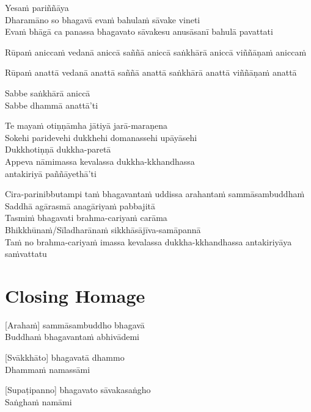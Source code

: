 Yesaṁ pariññāya\\
Dharamāno so bhagavā evaṁ bahulaṁ sāvake vineti\\
Evaṁ bhāgā ca panassa bhagavato sāvakesu anusāsanī bahulā pavattati

Rūpaṁ aniccaṁ vedanā aniccā saññā aniccā saṅkhārā aniccā viññāṇaṁ aniccaṁ

Rūpaṁ anattā vedanā anattā saññā anattā saṅkhārā anattā viññāṇaṁ anattā

Sabbe saṅkhārā aniccā\\
Sabbe dhammā anattā'ti

Te mayaṁ otiṇṇāmha jātiyā jarā-maraṇena\\
Sokehi paridevehi dukkhehi domanassehi upāyāsehi\\
Dukkhotiṇṇā dukkha-paretā\\
Appeva nāmimassa kevalassa dukkha-kkhandhassa\\
antakiriyā paññāyethā'ti

Cira-parinibbutampi taṁ bhagavantaṁ uddissa arahantaṁ sammāsambuddhaṁ\\
Saddhā agārasmā anagāriyaṁ pabbajitā\\
Tasmiṁ bhagavati brahma-cariyaṁ carāma\\
Bhikkhūnaṁ/Sīladharānaṁ sikkhāsājīva-samāpannā\\
Taṁ no brahma-cariyaṁ imassa kevalassa dukkha-kkhandhassa antakiriyāya saṁvattatu

\section*{Closing Homage}

[Arahaṁ] sammāsambuddho bhagavā\\
Buddhaṁ bhagavantaṁ abhivādemi

[Svākkhāto] bhagavatā dhammo\\
Dhammaṁ namassāmi

[Supaṭipanno] bhagavato sāvakasaṅgho\\
Saṅghaṁ namāmi

